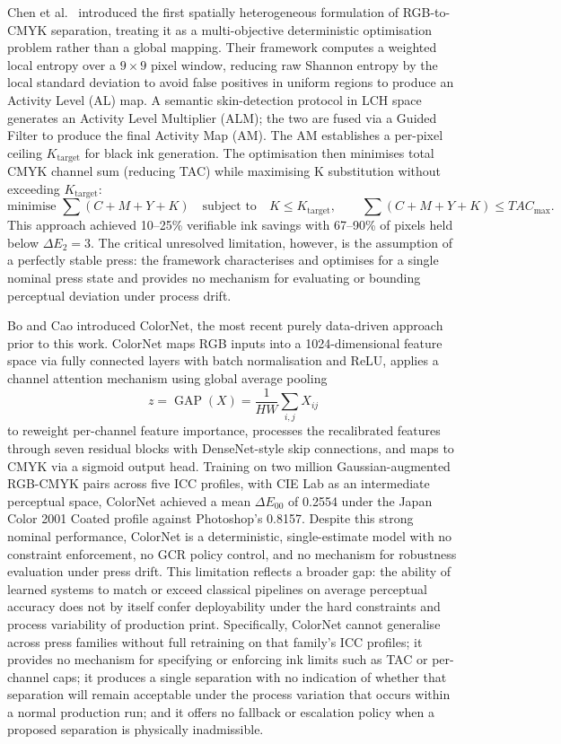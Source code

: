 \documentclass[11pt]{article}
\begin{document}
Chen et al.\ \cite{chen} introduced the first spatially heterogeneous formulation of RGB-to-CMYK separation, treating it as a multi-objective deterministic optimisation problem rather than a global mapping. Their framework computes a weighted local entropy over a $9\times 9$ pixel window, reducing raw Shannon entropy by the local standard deviation to avoid false positives in uniform regions to produce an Activity Level (AL) map. A semantic skin-detection protocol in LCH space generates an Activity Level Multiplier (ALM); the two are fused via a Guided Filter to produce the final Activity Map (AM). The AM establishes a per-pixel ceiling $K_{\text{target}}$ for black ink generation. The optimisation then minimises total CMYK channel sum (reducing TAC) while maximising K substitution without exceeding $K_{\text{target}}$:
\[
\text{minimise } \sum (C + M + Y + K)
\quad \text{subject to} \quad
K \leq K_{\text{target}}, \qquad \sum (C + M + Y + K) \leq TAC_{\max}.
\]
This approach achieved 10--25\% verifiable ink savings with 67--90\% of pixels held below $\Delta E_2 = 3$. The critical unresolved limitation, however, is the assumption of a perfectly stable press: the framework characterises and optimises for a single nominal press state and provides no mechanism for evaluating or bounding perceptual deviation under process drift.

Bo and Cao \cite{bo} introduced ColorNet, the most recent purely data-driven approach prior to this work. ColorNet maps RGB inputs into a 1024-dimensional feature space via fully connected layers with batch normalisation and ReLU, applies a channel attention mechanism using global average pooling
\[
z = \operatorname{GAP}(X) = \frac{1}{HW}\sum_{i,j} X_{ij}
\]
to reweight per-channel feature importance, processes the recalibrated features through seven residual blocks with DenseNet-style skip connections, and maps to CMYK via a sigmoid output head. Training on two million Gaussian-augmented RGB-CMYK pairs across five ICC profiles, with CIE Lab as an intermediate perceptual space, ColorNet achieved a mean $\Delta E_{00}$ of 0.2554 under the Japan Color 2001 Coated profile against Photoshop's 0.8157. Despite this strong nominal performance, ColorNet is a deterministic, single-estimate model with no constraint enforcement, no GCR policy control, and no mechanism for robustness evaluation under press drift. This limitation reflects a broader gap: the ability of learned systems to match or exceed classical pipelines on average perceptual accuracy does not by itself confer deployability under the hard constraints and process variability of production print. Specifically, ColorNet cannot generalise across press families without full retraining on that family's ICC profiles; it provides no mechanism for specifying or enforcing ink limits such as TAC or per-channel caps; it produces a single separation with no indication of whether that separation will remain acceptable under the process variation that occurs within a normal production run; and it offers no fallback or escalation policy when a proposed separation is physically inadmissible.
\end{document}
